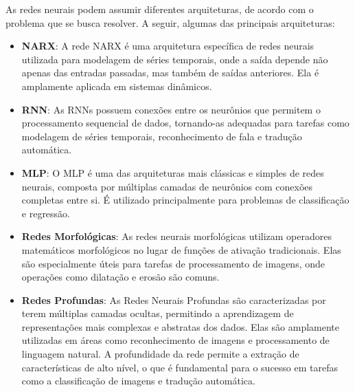 As redes neurais podem assumir diferentes arquiteturas, de acordo com o problema que se busca resolver. A seguir, algumas das principais arquiteturas:

\begin{itemize}

	\item \textbf{\acf{NARX}}: A rede \ac{NARX} é uma arquitetura específica de redes neurais utilizada para modelagem de séries temporais, onde a saída depende não apenas das entradas passadas, mas também de saídas anteriores. Ela é amplamente aplicada em sistemas dinâmicos.

	\item \textbf{\acf{RNN}}: As \acp{RNN} possuem conexões entre os neurônios que permitem o processamento sequencial de dados, tornando-as adequadas para tarefas como modelagem de séries temporais, reconhecimento de fala e tradução automática.

	\item \textbf{\acf{MLP}}: O \ac{MLP} é uma das arquiteturas mais clássicas e simples de redes neurais, composta por múltiplas camadas de neurônios com conexões completas entre si. É utilizado principalmente para problemas de classificação e regressão.

	\item \textbf{Redes Morfológicas}: As redes neurais morfológicas utilizam operadores matemáticos morfológicos no lugar de funções de ativação tradicionais. Elas são especialmente úteis para tarefas de processamento de imagens, onde operações como dilatação e erosão são comuns.

	\item \textbf{Redes Profundas}: As Redes Neurais Profundas são caracterizadas por terem múltiplas camadas ocultas, permitindo a aprendizagem de representações mais complexas e abstratas dos dados. Elas são amplamente utilizadas em áreas como reconhecimento de imagens e processamento de linguagem natural. A profundidade da rede permite a extração de características de alto nível, o que é fundamental para o sucesso em tarefas como a classificação de imagens e tradução automática.

\end{itemize}
